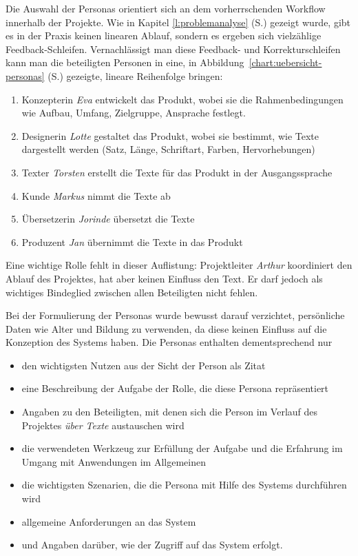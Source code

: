 Die Auswahl der Personas orientiert sich an dem vorherrschenden Workflow innerhalb der Projekte. Wie in Kapitel \ref{l:problemanalyse} (S.\pageref{l:problemanalyse}) gezeigt wurde, gibt es in der Praxis keinen linearen Ablauf, sondern es ergeben sich vielzählige Feedback-Schleifen. Vernachlässigt man diese Feedback- und Korrekturschleifen kann man die beteiligten Personen in eine, in Abbildung~\ref{chart:uebersicht-personas} (S.\pageref{chart:uebersicht-personas}) gezeigte, lineare Reihenfolge bringen:
\begin{samepage}\begin{enumerate}\itemsep -5pt
\item Konzepterin \emph{Eva} entwickelt das Produkt, wobei sie die Rahmenbedingungen wie Aufbau, Umfang, Zielgruppe, Ansprache festlegt. 
\item Designerin \emph{Lotte} gestaltet das Produkt, wobei sie bestimmt, wie Texte dargestellt werden (Satz, Länge, Schriftart, Farben, Hervorhebungen)
\item Texter \emph{Torsten} erstellt die Texte für das Produkt in der Ausgangssprache
\item Kunde \emph{Markus} nimmt die Texte ab
\item Übersetzerin \emph{Jorinde} übersetzt die Texte
\item Produzent \emph{Jan} übernimmt die Texte in das Produkt
\end{enumerate}\end{samepage}

Eine wichtige Rolle fehlt in dieser Auflistung: Projektleiter \emph{Arthur} koordiniert den Ablauf des Projektes, hat aber keinen Einfluss den Text. Er darf jedoch als wichtiges Bindeglied zwischen allen Beteiligten  nicht fehlen.

Bei der Formulierung der Personas wurde bewusst darauf verzichtet, persönliche Daten wie Alter und Bildung zu verwenden, da diese keinen Einfluss auf die Konzeption des Systems haben. Die Personas enthalten dementsprechend nur 
\begin{itemize}\itemsep -5pt
\item den wichtigsten Nutzen aus der Sicht der Person als Zitat
\item eine Beschreibung der Aufgabe der Rolle, die diese Persona repräsentiert
\item Angaben zu den Beteiligten, mit denen sich die Person im Verlauf des Projektes \emph{über Texte} austauschen wird
\item die verwendeten Werkzeug zur Erfüllung der Aufgabe und die Erfahrung im Umgang mit Anwendungen im Allgemeinen
\item die wichtigsten Szenarien, die die Persona mit Hilfe des Systems durchführen wird
\item allgemeine Anforderungen an das System
\item und Angaben darüber, wie der Zugriff auf das System erfolgt.
\end{itemize}

